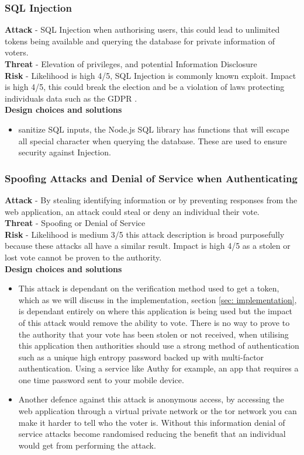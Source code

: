 \documentclass{entcs}
\begin{document}
\subsubsection{SQL Injection}
\textbf{Attack} - SQL Injection when authorising users, this could lead to unlimited tokens being available and querying the database for private information of voters. \\
\textbf{Threat} - Elevation of privileges, and potential Information Disclosure \\
\textbf{Risk} - Likelihood is high 4/5, SQL Injection is commonly known exploit. Impact is high 4/5, this could break the election and be a violation of laws protecting individuals data such as the GDPR \cite{GDPR}.\\
\textbf{Design choices and solutions}
\begin{itemize}
    \item sanitize SQL inputs, the Node.js SQL library has functions that will escape all special character when querying the database. These are used to ensure security against Injection.
\end{itemize}

\subsubsection{Spoofing Attacks and Denial of Service when Authenticating}
\textbf{Attack} -  By stealing identifying information or by preventing responses from the web application, an attack could steal or deny an individual their vote. \\
\textbf{Threat} - Spoofing or Denial of Service\\
\textbf{Risk} - Likelihood is medium 3/5 this attack description is broad purposefully because these attacks all have a similar result. Impact is high 4/5 as a stolen or lost vote cannot be proven to the authority.\\
\textbf{Design choices and solutions}\\
\begin{itemize}
    \item This attack is dependant on the verification method used to get a token, which as we will discuss in the implementation, section \ref{sec: implementation}, is dependant entirely on where this application is being used but the impact of this attack would remove the ability to vote. There is no way to prove to the authority that your vote has been stolen or not received, when utilising this application then authorities should use a strong method of authentication such as a unique high entropy password backed up with multi-factor authentication. Using a service like Authy \cite{Authy} for example, an app that requires a one time password sent to your mobile device.
    \item Another defence against this attack is anonymous access, by accessing the web application through a virtual private network or the tor network you can make it harder to tell who the voter is. Without this information denial of service attacks become randomised reducing the benefit that an individual would get from performing the attack.
\end{itemize}
\end{document}
